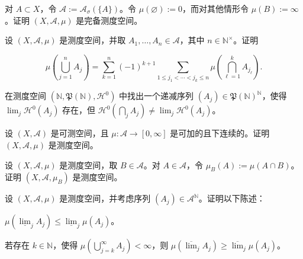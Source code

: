\begin{exercises}
\item

对 $ A \subset X $，令 $ \mathcal{A} := \mathcal{A}_{\sigma}(\{A\}) $。令 $ \mu(\varnothing) := 0 $，而对其他情形令 $ \mu(B) := \infty $。证明 $ (X, \mathcal{A}, \mu) $ 是完备测度空间。

\item

设 $ (X, \mathcal{A}, \mu) $ 是测度空间，并取 $ A_{1}, \ldots, A_{n} \in \mathcal{A} $，其中 $ n \in \mathbb{N}^{\times} $。证明

\[
\mu\left(\bigcup_{j=1}^{n} A_{j}\right) = \sum_{k=1}^{n} (-1)^{k+1} \sum_{1 \le j_{1} < \cdots < j_{k} \le n} \mu\left(\bigcap_{\ell=1}^{k} A_{j_{\ell}}\right) .
\]
\item

在测度空间 $ (\mathbb{N}, \mathfrak{P}(\mathbb{N}), \mathcal{H}^{0}) $ 中找出一个递减序列 $ (A_{j}) \in \mathfrak{P}(\mathbb{N})^{\mathbb{N}} $，使得 $ \lim_{j} \mathcal{H}^{0}(A_{j}) $ 存在，但 $ \mathcal{H}^{0}\left(\bigcap_{j} A_{j}\right) \ne \lim_{j} \mathcal{H}^{0}(A_{j}) $。

\item

设 $ (X, \mathcal{A}) $ 是可测空间，且 $ \mu : \mathcal{A} \to [0, \infty] $ 是可加的且下连续的。证明 $ (X, \mathcal{A}, \mu) $ 是测度空间。

\item

设 $ (X, \mathcal{A}, \mu) $ 是测度空间，取 $ B \in \mathcal{A} $。对 $ A \in \mathcal{A} $，令 $ \mu_{B}(A) := \mu(A \cap B) $。证明 $ (X, \mathcal{A}, \mu_{B}) $ 是测度空间。

\item

设 $ (X, \mathcal{A}, \mu) $ 是测度空间，并考虑序列 $ (A_{j}) \in \mathcal{A}^{\mathbb{N}} $。证明以下陈述：

\begin{items}
\item

$ \mu(\underline{\lim}_{j} A_{j}) \le \underline{\lim}_{j} \mu(A_{j}) $。

\item

若存在 $ k \in \mathbb{N} $，使得 $ \mu\left(\bigcup_{j=k}^{\infty} A_{j}\right) < \infty $，则 $ \mu(\overline{\lim}_{j} A_{j}) \ge \overline{\lim}_{j} \mu(A_{j}) $。

\item


\end{items}
\end{exercises}
